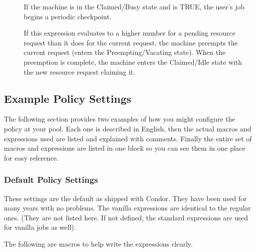 \begin{description}
\item[] If the machine is in the
  Claimed/Busy state and  is TRUE, the
  user's job begins a periodic checkpoint.
  
\item[] If this expression evaluates to a higher number for
  a pending resource request than it does for the current request, the
  machine preempts the current request (enters the
  Preempting/Vacating state).  When the preemption is complete, the
  machine enters the Claimed/Idle state with the new resource
  request claiming it.

\end{description}

\subsection{\label{sec:Example-Policy}Example Policy Settings}

The following section provides two examples of how you might configure
the policy at your pool.  Each one is described in English, then the
actual macros and expressions used are listed and explained with
comments.  Finally the entire set of macros and expressions are listed
in one block so you can see them in one place for easy reference.

\subsubsection{\label{sec:Default-Policy}Default Policy Settings}

These settings are the default as shipped with Condor.  They have been
used for many years with no problems.  The vanilla expressions are
identical to the regular ones. (They are not listed here.  If
not defined, the standard expressions are used for vanilla jobs
as well).

The following are macros to help write the expressions
clearly.

